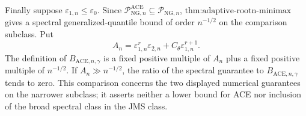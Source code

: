 Finally suppose \(\varepsilon_{1,n}\le\varepsilon_0\).  Since \(\mathcal P_{\mathrm{NG},n}^{\mathrm{ACE}}\subseteq\mathcal P_{\mathrm{NG},n}\), \(\text{thm:adaptive-rootn-minimax}\) gives a spectral generalized-quantile bound of order \(n^{-1/2}\) on the comparison subclass.  Put
\[
 A_n=\varepsilon_{1,n}^r\varepsilon_{2,n}
     +C_{\theta}\varepsilon_{1,n}^{r+1}.
\]
The definition of \(B_{\mathrm{ACE},n,\gamma}\) is a fixed positive multiple of \(A_n\) plus a fixed positive multiple of \(n^{-1/2}\).  If \(A_n\gg n^{-1/2}\), the ratio of the spectral guarantee to \(B_{\mathrm{ACE},n,\gamma}\) tends to zero.  This comparison concerns the two displayed numerical guarantees on the narrower subclass; it asserts neither a lower bound for ACE nor inclusion of the broad spectral class in the JMS class.